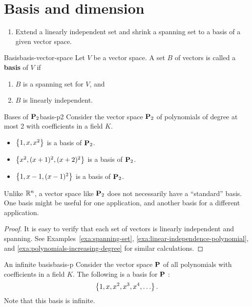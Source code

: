 \section{Basis and dimension}

\begin{outcome}
  \begin{enumerate}
  \item Extend a linearly independent set and shrink a spanning set to
    a basis of a given vector space.
  \end{enumerate}
\end{outcome}

\begin{definition}{Basis}{basis-vector-space}
  Let $V$ be a vector space. A set $B$ of vectors is called a
  \textbf{basis}%
   of $V$ if
  \begin{enumerate}
  \item $B$ is a spanning set for $V$, and
  \item $B$ is linearly independent.
  \end{enumerate}
\end{definition}

\begin{example}{Bases of $\mathbf{P}_2$}{basis-p2}
  Consider the vector space $\mathbf{P}_2$ of polynomials of degree at most
  2 with coefficients in a field $K$.%
  \begin{itemize}
  \item $\left\{1, x, x^2\right\}$ is a basis of $\mathbf{P}_2$.
  \item $\left\{x^2, (x+1)^2, (x+2)^2\right\}$ is a basis of $\mathbf{P}_2$.
  \item $\left\{1, x-1, (x-1)^2\right\}$ is a basis of $\mathbf{P}_2$.
  \end{itemize}
  Unlike $\mathbb{R}^n$, a vector space like $\mathbf{P}_2$ does not
  necessarily have a ``standard'' basis. One basis might be useful for
  one application, and another basis for a different application.
\end{example}

\begin{proof}
  It is easy to verify that each set of vectors is linearly
  independent and spanning. See Examples~\ref{exa:spanning-set},
  {\ref{exa:linear-independence-polynomial}}, and
  {\ref{exa:polynomials-increasing-degree}} for similar calculations.
\end{proof}

\begin{example}{An infinite basis}{basis-p}
  Consider the vector space $\mathbf{P}$ of all polynomials with
  coefficients in a field $K$. The following is a basis for $\mathbf{P}$%
  :
  \begin{equation*}
    \left\{1, x, x^2, x^3, x^4, \ldots\right\}.
  \end{equation*}
  Note that this basis is infinite.
\end{example}

